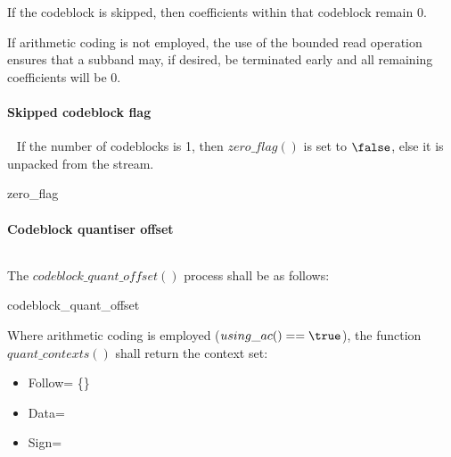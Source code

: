 If the codeblock is skipped, then coefficients within that codeblock remain 0.

\begin{informative}
If arithmetic coding is not employed, the use of the bounded read operation ensures
that a subband may, if desired, be terminated early and all remaining coefficients
will be 0.
\end{informative}

\paragraph{Skipped codeblock flag}
\label{zeroblockflag}
$\ $\newline$\ $\newline
If the number of codeblocks is 1, then $zero\_flag()$ is set to $\false$, else
it is unpacked from the stream.

\begin{pseudo}{zero\_flag}{}
    \bsRET{\false}
\bsELSE
\bsEND
\end{pseudo}

\paragraph{Codeblock quantiser offset}
$\ $\newline$\ $\newline
\label{blockquantidx}

The $codeblock\_quant\_offset()$ process shall be as follows:
\begin{pseudo}{codeblock\_quant\_offset}{}
\bsELSE
\bsEND
\end{pseudo}

Where arithmetic coding is employed ($using\_ac()==\true$), the function $quant\_contexts()$ shall
return the context set:
  \begin{itemize}
  \item{Follow= \{\QOffsetFollow\}}
  \item{Data=\QOffsetData}
  \item{Sign=\QOffsetSign}
  \end{itemize}

